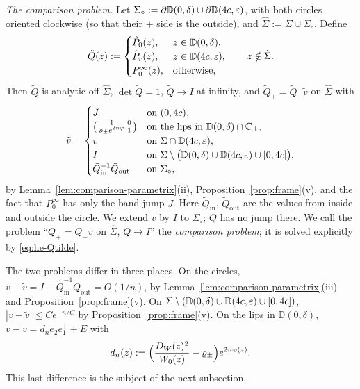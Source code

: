 \emph{The comparison problem.} Let $\Sigma_{\circ}:=\partial \mathbb D(0,\delta)\cup\partial \mathbb D(4c,\varepsilon)$, with both circles
oriented clockwise (so that their $+$ side is the outside), and $\hat\Sigma:=\Sigma\cup\Sigma_{\circ}$. Define
\begin{equation}\label{eq:he-Qtilde}
  \tilde Q(z):=\begin{cases}\hat P_0(z),& z\in \mathbb D(0,\delta),\\ \hat P_r(z),& z\in \mathbb D(4c,\varepsilon),\\
  P^\infty_0(z),& \text{otherwise},\end{cases}\qquad z\notin\hat\Sigma .
\end{equation}
Then $\tilde Q$ is analytic off $\hat\Sigma$, $\det\tilde Q=1$, $\tilde Q\to I$ at infinity, and
$\tilde Q_+=\tilde Q_-\tilde v$ on $\hat\Sigma$ with
\begin{equation}\label{eq:he-vtilde}
  \tilde v=\begin{cases}J & \text{on }(0,4c),\\
  \bigl(\begin{smallmatrix}1&0\\\varrho_\pm e^{2n\varphi}&1\end{smallmatrix}\bigr) & \text{on the lips in }\mathbb D(0,\delta)\cap\mathbb{C}_\pm,\\
  v & \text{on }\Sigma\cap \mathbb D(4c,\varepsilon),\\
  I & \text{on }\Sigma\setminus\bigl(\mathbb D(0,\delta)\cup \mathbb D(4c,\varepsilon)\cup[0,4c]\bigr),\\
  \tilde Q_{\mathrm{in}}^{-1}\tilde Q_{\mathrm{out}} & \text{on }\Sigma_{\circ},
  \end{cases}
\end{equation}
by Lemma~\ref{lem:comparison-parametrix}(ii), Proposition~\ref{prop:frame}(v), and the fact that $P^\infty_0$ has only the band jump $J$. Here
$\tilde Q_{\mathrm{in}}$, $\tilde Q_{\mathrm{out}}$ are the values from inside and outside the circle. We extend $v$ by
$I$ to $\Sigma_{\circ}$; $Q$ has no jump there. We call the problem ``$\tilde Q_+=\tilde Q_-\tilde v$ on $\hat\Sigma$,
$\tilde Q\to I$'' the \emph{comparison problem}; it is solved explicitly by \eqref{eq:he-Qtilde}.

The two problems differ in three places. On the circles, $v-\tilde v=I-\tilde Q_{\mathrm{in}}^{-1}\tilde
Q_{\mathrm{out}}=O(1/n)$, by Lemma~\ref{lem:comparison-parametrix}(iii) and Proposition~\ref{prop:frame}(v). On
$\Sigma\setminus(\mathbb D(0,\delta)\cup \mathbb D(4c,\varepsilon)\cup[0,4c])$, $|v-\tilde v|\le Ce^{-n/C}$ by Proposition~\ref{prop:frame}(v). On the lips in
$\mathbb D(0,\delta)$, $v-\tilde v=d_ne_2e_1^{\mathsf T}+E$ with
\begin{equation}\label{eq:he-dn}
  d_n(z):=\Bigl(\frac{D_W(z)^2}{W_0(z)}-\varrho_\pm\Bigr)e^{2n\varphi(z)} .
\end{equation}
This last difference is the subject of the next subsection.


